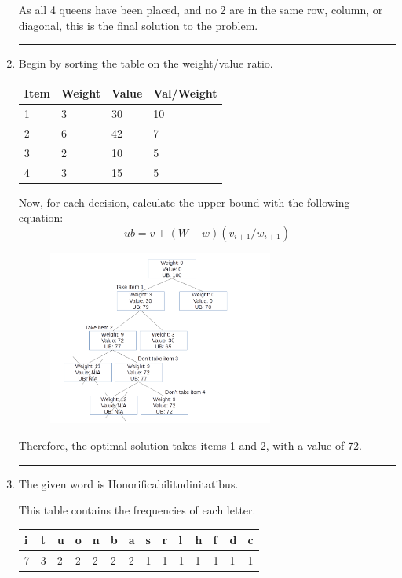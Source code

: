 \documentclass{article}
\begin{document}
\begin{enumerate}
As all 4 queens have been placed, and no 2 are in the same row, column, or diagonal, this is the final solution to the problem. 


\noindent\rule{8cm}{0.4pt}

\item Begin by sorting the table on the weight/value ratio. 

\begin{table}[H]
\begin{tabular}{|l|l|l|l|}
\hline
Item & Weight & Value & Val/Weight \\ \hline
1 & 3 & 30 & 10 \\ \hline
2 & 6 & 42 & 7 \\ \hline
3 & 2 & 10 & 5 \\ \hline
4 & 3 & 15 & 5 \\ \hline
\end{tabular}
\end{table}

Now, for each decision, calculate the upper bound with the following equation: 
\[ub = v + (W-w)(v_{i+1}/w_{i+1})\]
\begin{figure}[H]
        \centering
	\includegraphics[width=0.7\textwidth]{P8/branchandbound}
\end{figure}

Therefore, the optimal solution takes items 1 and 2, with a value of 72. 

\noindent\rule{8cm}{0.4pt}

\item  The given word is Honorificabilitudinitatibus. 

    This table contains the frequencies of each letter. 
\begin{table}[H]
\begin{tabular}{|l|l|l|l|l|l|l|l|l|l|l|l|l|l|}
\hline
i & t & u & o & n & b & a & s & r & l & h & f & d & c \\ \hline
7 & 3 & 2 & 2 & 2 & 2 & 2 & 1 & 1 & 1 & 1 & 1 & 1 & 1 \\ \hline
\end{tabular}
\end{table}


\end{enumerate}
\end{document}

